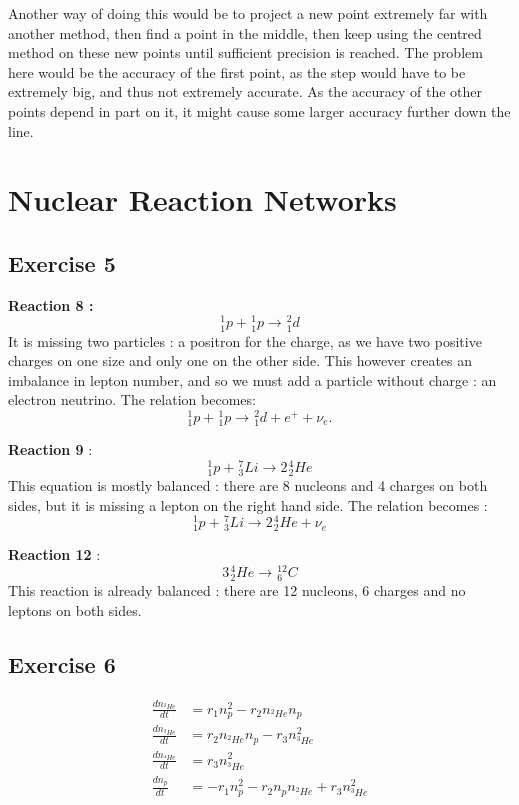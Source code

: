 \documentclass[a4paper,12pt]{article}
\begin{document}
Another way of doing this would be to project a new point extremely far with another method, then find a point in the middle, then keep using the centred method on these new points until sufficient precision is reached. The problem here would be the accuracy of the first point, as the step would have to be extremely big, and thus not extremely accurate. As the accuracy of the other points depend in part on it, it might cause some larger accuracy further down the line.

\section{Nuclear Reaction Networks}
\subsection{Exercise 5}
\textbf{Reaction 8 :} $$^1_1p +\hspace{1pt}^1_1p \rightarrow \hspace{1pt}^2_1d$$
It is missing two particles : a positron for the charge, as we have two positive charges on one size and only one on the other side. This however creates an imbalance in lepton number, and so we must add a particle without charge : an electron neutrino. The relation becomes: $$^1_1p +\hspace{1pt}^1_1p \rightarrow\hspace{1pt} ^2_1d + e^+ + \nu_e.$$

\noindent \textbf{Reaction 9} : $$^1_1p +\hspace{1pt} ^7_3Li \rightarrow 2\hspace{1pt}^4_2He$$
This equation is mostly balanced : there are 8 nucleons and 4 charges on both sides, but it is missing a lepton on the right hand side. The relation becomes : $$^1_1p +\hspace{1pt} ^7_3Li \rightarrow 2\hspace{1pt}^4_2He +\nu_e$$

\noindent \textbf{Reaction 12} : $$3\hspace{1pt}^4_2He\rightarrow \hspace{1pt}_6^{12}C$$
This reaction is already balanced : there are 12 nucleons, 6 charges and no leptons on both sides.

\subsection{Exercise 6}
\begin{equation}
    \begin{split}
        \frac{dn_{^2He}}{dt} &= r_1n_p^2 - r_2n_{^2He}n_p\\
        \frac{dn_{^3He}}{dt} &= r_2n_{^2He}n_p - r_3n_{^3He}^2\\
        \frac{dn_{^4He}}{dt} &= r_3n_{^3He}^2\\
        \frac{dn_p}{dt} &= -r_1n_p^2 - r_2 n_pn_{^2He} + r_3n_{^3He}^2
    \end{split}
\end{equation}
\end{document}
